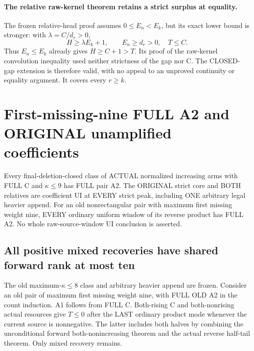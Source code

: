 \paragraph{The relative raw-kernel theorem retains a strict surplus at equality.}
The frozen relative-head proof assumes $0\le E_n<E_k$, but its exact
lower bound is stronger: with $\lambda=C/d_r>0$,
\[
 H\ge\lambda E_k+1,\qquad E_n\ge d_r>0,\quad T\le C.
\]
Thus $E_n\le E_k$ already gives $H\ge C+1>T$. Its proof of the
raw-kernel convolution inequality used neither strictness of the gap
nor C. The CLOSED-gap extension is therefore valid, with no appeal to
an unproved continuity or equality argument. It covers every $r\ge k$.

\section{First-missing-nine FULL A2 and ORIGINAL unamplified coefficients}
\begin{theorem}
Every final-deletion-closed class of ACTUAL normalized increasing arms
with FULL C and $\kappa\le9$ has FULL pair A2. The ORIGINAL strict
core and BOTH relatives are coefficient UI at EVERY strict peak,
including ONE arbitrary legal heavier append.
For an old nonrectangular pair with maximum first missing weight nine,
EVERY ordinary uniform window of its reverse product has FULL A2.
No whole raw-source-window UI conclusion is asserted.
\end{theorem}

\subsection{All positive mixed recoveries have shared forward rank at most ten}
The old maximum-$\kappa\le8$ class and arbitrary heavier append are
frozen. Consider an old pair of maximum first missing weight nine,
with FULL OLD A2 in the count induction. A1 follows from FULL C.
Both-rising C and both-nonrising actual resources give $T\le0$ after
the LAST ordinary product mode whenever the current source is nonnegative.
The latter includes both halves by combining the unconditional forward
both-nonincreasing theorem and the actual reverse half-tail theorem.
Only mixed recovery remains.

